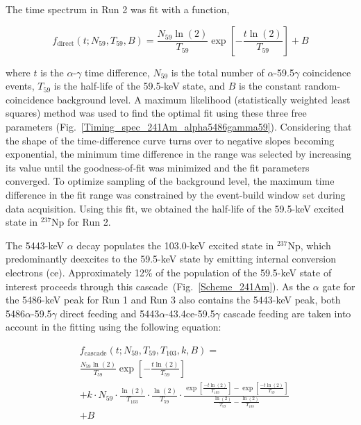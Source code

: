 \documentclass[aps,UTF8,prc,twocolumn,preprintnumbers,amsmath,amssymb,floatfix]{revtex4-2}
\begin{document}
The time spectrum in Run 2 was fit with a function,

\begin{equation}
f_{\text{direct}}(t;N_{59},T_{59},B) = \frac{N_{59} \ln(2)}{T_{59}} \exp\left[-\frac{t \ln(2)}{T_{59}}\right] + B
\label{eq:Direct}
\end{equation}

\noindent where $t$ is the $\alpha$-$\gamma$ time difference, $N_{59}$ is the total number of $\alpha$-59.5$\gamma$ coincidence events, $T_{59}$ is the half-life of the 59.5-keV state, and $B$ is the constant random-coincidence background level. A maximum likelihood (statistically weighted least squares) method was used to find the optimal fit using these three free parameters (Fig.~\ref{Timing_spec_241Am_alpha5486gamma59}). Considering that the shape of the time-difference curve turns over to negative slopes becoming exponential, the minimum time difference in the range was selected by increasing its value until the goodness-of-fit was minimized and the fit parameters converged. To optimize sampling of the background level, the maximum time difference in the fit range was constrained by the event-build window set during data acquisition. Using this fit, we obtained the half-life of the 59.5-keV excited state in $^{237}$Np for Run 2.

The 5443-keV $\alpha$ decay populates the 103.0-keV excited state in $^{237}$Np, which predominantly deexcites to the 59.5-keV state by emitting internal conversion electrons (ce). Approximately 12\% of the population of the 59.5-keV state of interest proceeds through this cascade~(Fig.~\ref{Scheme_241Am}). As the $\alpha$ gate for the 5486-keV peak for Run 1 and Run 3 also contains the 5443-keV peak, both 5486$\alpha$-59.5$\gamma$ direct feeding and 5443$\alpha$-43.4ce-59.5$\gamma$ cascade feeding are taken into account in the fitting using the following equation: 

\begin{equation}
\begin{split}
& f_{\text{cascade}}(t; N_{59}, T_{59}, T_{103}, k, B) = \\
& \frac{N_{59} \ln(2)}{T_{59}} \exp\left[-\frac{t \ln(2)}{T_{59}}\right] \\
& + k \cdot N_{59} \cdot \frac{\ln(2)}{T_{103}} \cdot \frac{\ln(2)}{T_{59}} \cdot \frac{ \exp\left[ \frac{-t \ln(2)}{T_{103}}\right] - \exp\left[\frac{-t \ln(2)}{T_{59}}\right]}{ \frac{\ln(2)}{T_{59}} - \frac{\ln(2)}{T_{103}}} \\
& + B
\label{eq:Cascade}
\end{split}
\end{equation}
\end{document}
